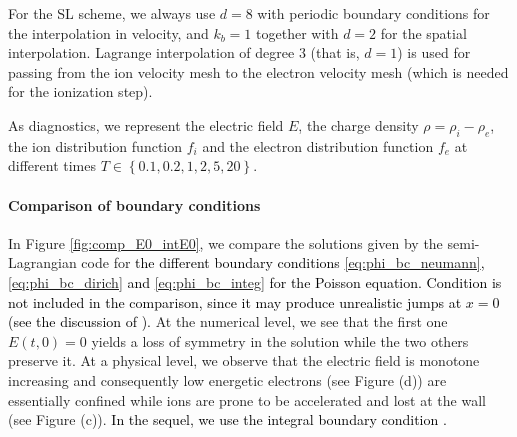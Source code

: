 \documentclass{article}
\numberwithin{equation}{section}
\begin{document}



For the SL scheme, we always use $d=8$ with periodic boundary conditions for the interpolation in velocity, and $k_b=1$ together with $d=2$ for the spatial interpolation.
Lagrange interpolation of degree $3$  (that is, $d=1$) is used for passing from the ion velocity mesh to the electron velocity mesh (which is needed for the ionization step).

As diagnostics, we represent the electric field $E$, the charge density $\rho=\rho_i-\rho_e$, the ion distribution function $f_i$ and the electron distribution function $f_e$ at different times $T\in \left\{0.1,0.2,1,2,5,20\right\}$.

\paragraph{Comparison of boundary conditions}

In Figure \ref{fig:comp_E0_intE0}, we compare the solutions given by the semi-Lagrangian code for \textcolor{black}{the different boundary conditions \eqref{eq:phi_bc_neumann}, \eqref{eq:phi_bc_dirich} and \eqref{eq:phi_bc_integ} for the Poisson equation. Condition  is not included in the comparison, since it may produce unrealistic jumps at $x=0$ (see the discussion of ).}
At the numerical level, we see that the first one $E(t,0) = 0$ yields a loss of symmetry in the solution while the two others preserve it. At a physical level, we observe that the electric field is monotone increasing  and consequently low energetic electrons (see Figure (d)) are essentially confined while ions are prone to be accelerated and lost at the wall (see Figure (c)). \textcolor{black}{In the sequel, we use the integral boundary condition .}
\end{document}
